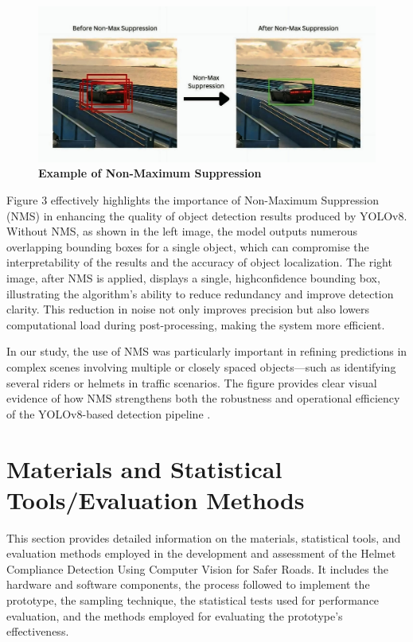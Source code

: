 \begin{refsection}
\begin{figure}[H]
    \centering
    \includegraphics[width=1\textwidth]{figures/Fig 3.jpg}
    \caption{\textbf{Example of Non-Maximum Suppression }}
    \label{figures/Fig 3.jpg}
\end{figure}
Figure 3 effectively highlights the importance of Non-Maximum Suppression (NMS) in enhancing the quality of object detection results produced by YOLOv8. Without NMS, as shown in the left image, the model outputs numerous overlapping bounding boxes for a single object, which can compromise the interpretability of the results and the accuracy of object localization. The right image, after NMS is applied, displays a single, highconfidence bounding box, illustrating the algorithm’s ability to reduce redundancy and improve detection clarity. This reduction in noise not only improves precision but also lowers computational load during post-processing, making the system more efficient.

In our study, the use of NMS was particularly important in refining predictions in complex scenes involving multiple or closely spaced objects—such as identifying several riders or helmets in traffic scenarios. The figure provides clear visual evidence of how NMS strengthens both the robustness and operational efficiency of the YOLOv8-based detection pipeline \cite{ThePythonCode2021}.

\section*{Materials and Statistical Tools/Evaluation Methods}

This section provides detailed information on the materials, statistical tools, and evaluation methods employed in the development and assessment of the Helmet Compliance Detection Using Computer Vision for Safer Roads. It includes the hardware and software components, the process followed to implement the prototype, the sampling technique, the statistical tests used for performance evaluation, and the methods employed for evaluating the prototype's effectiveness.


\end{refsection}
